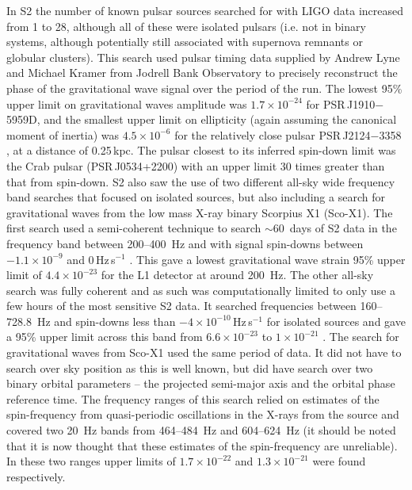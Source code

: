 \documentclass{article}
\begin{document}
In S2 the number of known pulsar sources searched for with LIGO data increased
from 1 to 28, although all of these were isolated pulsars (i.e. not in binary
systems, although potentially still associated with supernova remnants or
globular clusters). This search used pulsar timing data supplied by Andrew Lyne
and Michael Kramer from Jodrell Bank Observatory to precisely reconstruct the
phase of the gravitational wave signal over the period of the run. The lowest
95\% upper limit on gravitational waves amplitude was $1.7\times10^{-24}$ for
PSR\,J1910$-$5959D, and the smallest upper limit on ellipticity (again assuming
the canonical moment of inertia) was $4.5\times10^{-6}$ for the relatively close
pulsar PSR\,J2124$-$3358 \cite{Abbott:2005f}, at a distance of 0.25\,kpc. The
pulsar closest to its inferred spin-down limit was the Crab pulsar
(PSR\,J0534+2200) with an upper limit 30 times greater than that from spin-down.
S2 also saw the use of two different all-sky wide frequency band searches that
focused on isolated sources, but also including a search for gravitational waves
from the low mass X-ray binary Scorpius X1 (Sco-X1). The first search used a
semi-coherent technique to search $\sim60$~days of S2 data in the frequency band
between 200--400~Hz and with signal spin-downs between $-1.1\times10^{-9}$ and
0\,Hz\,s$^{-1}$ \cite{Abbott:2005g}. This gave a lowest gravitational wave
strain 95\% upper limit of $4.4\times10^{-23}$ for the L1 detector at around
200~Hz. The other all-sky search was fully coherent and as such was
computationally limited to only use a few hours of the most sensitive S2 data.
It searched frequencies between 160--728.8~Hz and spin-downs less than
$-4\times10^{-10}$\,Hz\,s$^{-1}$ for isolated sources and gave a 95\% upper
limit across this band from $6.6\times10^{-23}$ to $1\times10^{-21}$
\cite{Abbott:2007a}. The search for gravitational waves from Sco-X1 used the
same period of data. It did not have to search over sky position as this is well
known, but did have search over two binary orbital parameters -- the projected
semi-major axis and the orbital phase reference time. The frequency ranges of
this search relied on estimates of the spin-frequency from quasi-periodic
oscillations in the X-rays from the source and covered two 20~Hz bands from
464--484~Hz and 604--624~Hz (it should be noted that it is now thought that
these estimates of the spin-frequency are unreliable). In these two ranges upper
limits of $1.7\times10^{-22}$ and $1.3\times10^{-21}$ were found respectively.
\end{document}
